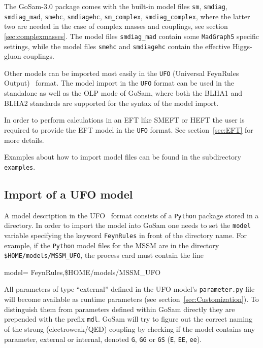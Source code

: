 \documentclass[11pt,a4paper]{refrep}
\newcommand{\gosamversion}{{3{.}0}}
\newcommand{\gosam}{{\sc GoSam}\xspace}
\begin{document}
The \gosam{}-\gosamversion{} package comes with the built-in model files 
{\tt sm}, {\tt smdiag}, {\tt smdiag\_mad}, {\tt smehc}, {\tt smdiagehc},
{\tt sm\_complex}, {\tt smdiag\_complex}, 
where the latter two are needed in the case of complex masses and couplings, 
see section \ref{sec:complexmasses}. 
The model files {\tt smdiag\_mad} contain some {\tt MadGraph5} specific settings, while
the model files {\tt smehc} and {\tt smdiagehc} contain the effective Higgs-gluon couplings.

Other models can be imported most easily in the {\tt UFO} (Universal FeynRules Output)~\cite{Degrande:2011ua,Darme:2023jdn} format.
The model import in the {\tt UFO} format can be used in the standalone as well as the OLP 
mode of \gosam, where both the BLHA1 and BLHA2 standards are supported for the syntax of the model import.

In order to perform calculations in an EFT like SMEFT or HEFT the user is required to provide the EFT model in the {\tt UFO} format. See section~\ref{sec:EFT} for more details.

Examples about how to import model files can be found in the subdirectory 
 \texttt{examples}.

\subsection{Import of a UFO model}\label{sec:UFO}
A model description in the UFO~\cite{Degrande:2011ua,Darme:2023jdn} format consists of a \texttt{Python} package
stored in a directory. In order to import the model into \gosam{} one needs
to set the \texttt{model} variable specifying the keyword \texttt{FeynRules}
in front of the directory name.
For example, if the \texttt{Python} model files for the MSSM are in 
 the directory \\
 \texttt{\$HOME/models/MSSM\_UFO}, the process card must contain the line
\begin{example}
model= FeynRules,\$HOME/models/MSSM\_UFO
\end{example}
All parameters of type ``external'' defined in the UFO model's \texttt{parameter.py} file will become available as runtime parameters (see section~\ref{sec:Customization}). To distinguish them from parameters defined within \gosam directly they are prepended with the prefix \texttt{mdl}. \gosam will try to figure out the correct naming of the strong (electroweak/QED) coupling by checking if the model contains any parameter, external or internal, denoted \texttt{G}, \texttt{GG} or \texttt{GS} (\texttt{E}, \texttt{EE}, \texttt{ee}).
\end{document}
